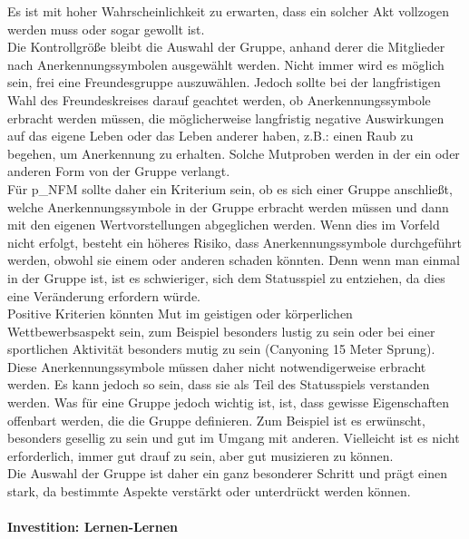 Es ist mit hoher Wahrscheinlichkeit zu erwarten, dass ein solcher Akt vollzogen werden muss oder sogar gewollt ist.\\


Die Kontrollgröße bleibt die Auswahl der Gruppe, anhand derer die Mitglieder nach Anerkennungssymbolen ausgewählt werden. Nicht immer wird es möglich sein, frei eine Freundesgruppe auszuwählen. Jedoch sollte bei der langfristigen Wahl des Freundeskreises darauf geachtet werden, ob Anerkennungssymbole erbracht werden müssen, die möglicherweise langfristig negative Auswirkungen auf das eigene Leben oder das Leben anderer haben, z.B.: einen Raub zu begehen, um Anerkennung zu erhalten. Solche Mutproben werden in der ein oder anderen Form von der Gruppe verlangt.\\


Für \gls{p_NFM} sollte daher ein Kriterium sein, ob es sich einer Gruppe anschließt, welche Anerkennungssymbole in der Gruppe erbracht werden müssen und dann mit den eigenen Wertvorstellungen abgeglichen werden. Wenn dies im Vorfeld nicht erfolgt, besteht ein höheres Risiko, dass Anerkennungssymbole durchgeführt werden, obwohl sie einem oder anderen schaden könnten. Denn wenn man einmal in der Gruppe ist, ist es schwieriger, sich dem Statusspiel zu entziehen, da dies eine Veränderung erfordern würde.\\


Positive Kriterien könnten Mut im geistigen oder körperlichen Wettbewerbsaspekt sein, zum Beispiel besonders lustig zu sein oder bei einer sportlichen Aktivität besonders mutig zu sein (Canyoning 15 Meter Sprung).\\


Diese Anerkennungssymbole müssen daher nicht notwendigerweise erbracht werden. Es kann jedoch so sein, dass sie als Teil des Statusspiels verstanden werden. Was für eine Gruppe jedoch wichtig ist, ist, dass gewisse Eigenschaften offenbart werden, die die Gruppe definieren. Zum Beispiel ist es erwünscht, besonders gesellig zu sein und gut im Umgang mit anderen. Vielleicht ist es nicht erforderlich, immer gut drauf zu sein, aber gut musizieren zu können.\\


Die Auswahl der Gruppe ist daher ein ganz besonderer Schritt und prägt einen stark, da bestimmte Aspekte verstärkt oder unterdrückt werden können.

\paragraph{Investition: Lernen-Lernen}

